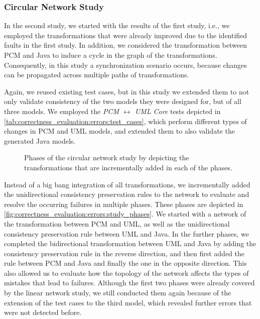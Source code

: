 \subsubsection*{Circular Network Study} 

In the second study, we started with the results of the first study, i.e., we employed the transformations that were already improved due to the identified faults in the first study.
In addition, we considered the transformation between \gls{PCM} and Java to induce a cycle in the graph of the transformations.
Consequently, in this study a synchronization scenario occurs, because changes can be propagated across multiple paths of transformations.

Again, we reused existing test cases, but in this study we extended them to not only validate consistency of the two models they were designed for, but of all three models.
We employed the \emph{PCM $\leftrightarrow$ UML Core} tests depicted in \autoref{tab:correctness_evaluation:errors:test_cases}, which perform different types of changes in \gls{PCM} and \gls{UML} models, and extended them to also validate the generated Java models.

\begin{figure}
    \centering
    
    \caption[Phases of second case study]{Phases of the circular network study by depicting the transformations that are incrementally added in each of the phases.}
    \label{fig:correctness_evaluation:errors:study_phases}
\end{figure}

Instead of a big bang integration of all transformations, we incrementally added the unidirectional consistency preservation rules to the network to evaluate and resolve the occurring failures in multiple phases.
These phases are depicted in \autoref{fig:correctness_evaluation:errors:study_phases}.
We started with a network of the transformation between \gls{PCM} and \gls{UML}, as well as the unidirectional consistency preservation rule between \gls{UML} and Java.
In the further phases, we completed the bidirectional transformation between \gls{UML} and Java by adding the consistency preservation rule in the reverse direction, and then first added the rule between \gls{PCM} and Java and finally the one in the opposite direction.
This also allowed us to evaluate how the topology of the network affects the types of mistakes that lead to failures.
Although the first two phases were already covered by the linear network study, we still conducted them again because of the extension of the test cases to the third model, which revealed further errors that were not detected before.

